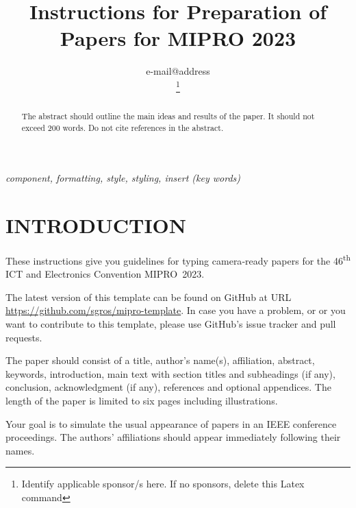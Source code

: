 \documentclass{MIPRO}
\begin{document}
\title{Instructions for Preparation of Papers for MIPRO 2023}

\author{



e-mail@address

\thanks{Identify applicable sponsor/s here. If no sponsors, delete this Latex command}
}

\maketitle

\begin{abstract}
The abstract should outline the main ideas and results of the paper. It should not exceed 200 words. Do not cite references in the abstract. 
\end{abstract}

\renewcommand\IEEEkeywordsname{Keywords}
\begin{IEEEkeywords}
\textit{component, formatting, style, styling, insert (key words)}
\end{IEEEkeywords}

\section{INTRODUCTION}

These instructions give you guidelines for typing camera‑ready papers for the 46\textsuperscript{th} ICT and Electronics Convention MIPRO 2023.

The latest version of this template can be found on GitHub at URL \url{https://github.com/sgros/mipro-template}. In case you have a problem, or or you want to contribute to this template, please use GitHub's issue tracker and pull requests.

The paper should consist of a title, author's name(s), affiliation, abstract, keywords, introduction, main text with section titles and subheadings (if any), conclusion, acknowledgment (if any), references and optional appendices. The length of the paper is limited to six pages including illustrations.

Your goal is to simulate the usual appearance of papers in an IEEE conference proceedings. The authors' affiliations should appear immediately following their names.
\end{document}
